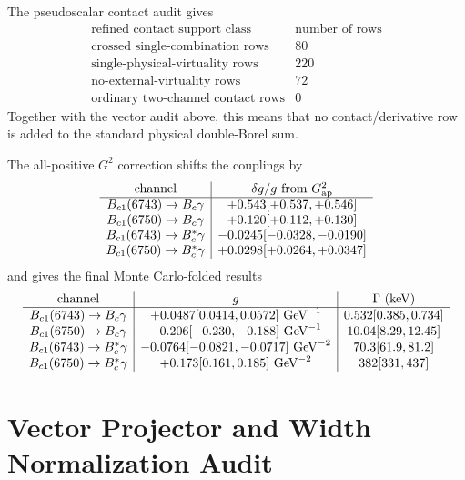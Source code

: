 \documentclass[11pt]{article}
\newcommand{\Bc}{B_c}
\newcommand{\Bcst}{B_c^\ast}
\newcommand{\BcOne}{B_{c1}}
\begin{document}
The pseudoscalar contact audit gives
\[
\begin{array}{c|c}
\text{refined contact support class} & \text{number of rows}\\
\hline
\text{crossed single-combination rows} & 80\\
\text{single-physical-virtuality rows} & 220\\
\text{no-external-virtuality rows} & 72\\
\text{ordinary two-channel contact rows} & 0
\end{array}
\]
Together with the vector audit above, this means that no contact/derivative row
is added to the standard physical double-Borel sum.

The all-positive \(G^2\) correction shifts the couplings by
\[
\begin{array}{c|c}
\text{channel} & \delta g/g\ \text{from}\ G^2_{\rm ap}\\
\hline
\BcOne(6743)\to\Bc\gamma & +0.543[+0.537,+0.546]\\
\BcOne(6750)\to\Bc\gamma & +0.120[+0.112,+0.130]\\
\BcOne(6743)\to\Bcst\gamma & -0.0245[-0.0328,-0.0190]\\
\BcOne(6750)\to\Bcst\gamma & +0.0298[+0.0264,+0.0347]
\end{array}
\]
and gives the final Monte Carlo-folded results
\[
\begin{array}{c|c|c}
\text{channel} & g & \Gamma~({\rm keV})\\
\hline
\BcOne(6743)\to\Bc\gamma & +0.0487[0.0414,0.0572]~{\rm GeV}^{-1} & 0.532[0.385,0.734]\\
\BcOne(6750)\to\Bc\gamma & -0.206[-0.230,-0.188]~{\rm GeV}^{-1} & 10.04[8.29,12.45]\\
\BcOne(6743)\to\Bcst\gamma & -0.0764[-0.0821,-0.0717]~{\rm GeV}^{-2} & 70.3[61.9,81.2]\\
\BcOne(6750)\to\Bcst\gamma & +0.173[0.161,0.185]~{\rm GeV}^{-2} & 382[331,437]
\end{array}
\]

\section{Vector Projector and Width Normalization Audit}
\end{document}
